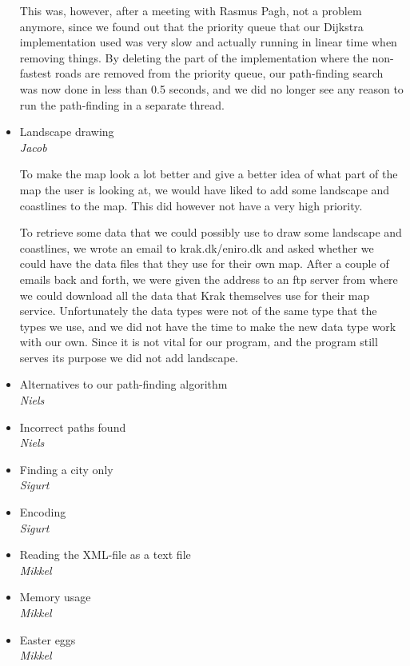 \documentclass[a4paper,11pt]{article}
\begin{document}
\begin{itemize}
		This was, however, after a meeting with Rasmus Pagh, not a problem anymore, since we found out that the priority queue that our Dijkstra implementation used was very slow and actually running in linear time when removing things. By deleting the part of the implementation where the non-fastest roads are removed from the priority queue, our path-finding search was now done in less than 0.5 seconds, and we did no longer see any reason to run the path-finding in a separate thread.

	\item Landscape drawing \\
		\textsl{Jacob}

		To make the map look a lot better and give a better idea of what part of the map the user is looking at, we would have liked to add some landscape and coastlines to the map. This did however not have a very high priority. 

		To retrieve some data that we could possibly use to draw some landscape and coastlines, we wrote an email to krak.dk/eniro.dk and asked whether we could have the data files that they use for their own map. After a couple of emails back and forth, we were given the address to an ftp server from where we could download all the data that Krak themselves use for their map service. Unfortunately the data types were not of the same type that the types we use, and we did not have the time to make the new data type work with our own. Since it is not vital for our program, and the program still serves its purpose we did not add landscape.

	\item Alternatives to our path-finding algorithm \\
		\textsl{Niels}
	\item Incorrect paths found \\
		\textsl{Niels}
	\item Finding a city only \\
		\textsl{Sigurt}
	\item Encoding \\
		\textsl{Sigurt}
	\item Reading the XML-file as a text file \\
		\textsl{Mikkel}
	\item Memory usage \\
		\textsl{Mikkel}
	\item Easter eggs \\
		\textsl{Mikkel}
\end{itemize}
\end{document}
